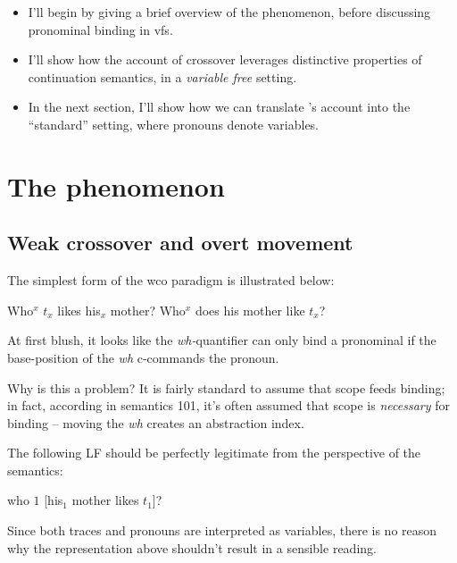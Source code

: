 \documentclass[nols,twoside,nofonts,nobib,nohyper]{tufte-handout}
\begin{document}
\begin{itemize}
    \item I'll begin by giving a brief overview of the phenomenon, before
    discussing pronominal binding in \acf{vfs}.

    \item I'll show how the \citeauthor{barkerShan2015} account of crossover
    leverages distinctive properties of continuation semantics, in a
    \textit{variable free} setting.

    \item In the next section, I'll show how we can translate
    \citeauthor{barkerShan2015}'s account into the \enquote{standard} setting,
    where pronouns denote variables.

\end{itemize}

\section{The phenomenon}

\subsection{Weak crossover and overt movement}




The simplest form of the \ac{wco} paradigm is illustrated below:

\pex
\a Who$^{x}$ $t_{x}$ likes his$_{x}$ mother?
\a\ljudge{*}Who$^{x}$ does his mother like $t_{x}$?
\xe

At first blush, it looks like the \textit{wh-}quantifier can only bind a
pronominal if the base-position of the \textit{wh} c-commands the pronoun.

Why is this a problem? It is fairly standard to assume that scope feeds binding;
in fact, according in semantics 101, it's often assumed that scope is
\textit{necessary} for binding -- moving the \textit{wh} creates an abstraction
index.

The following LF should be perfectly legitimate from the perspective of the
semantics:

\ex
who $1$ [his$_{1}$ mother likes $t_{1}$]?
\xe

Since both traces and pronouns are interpreted as variables, there is no reason
why the representation above shouldn't result in a sensible reading.
\end{document}
